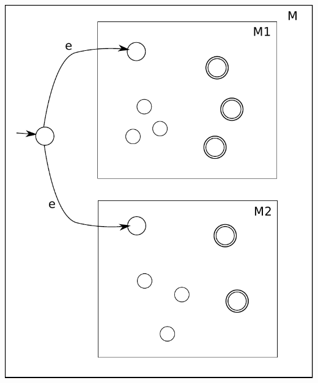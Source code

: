{\begin{columns}
     {
      \begin{center}
        \includegraphics[scale=0.4]{images/union_after.pdf}
      \end{center}
    }
  
  \end{columns}
}


